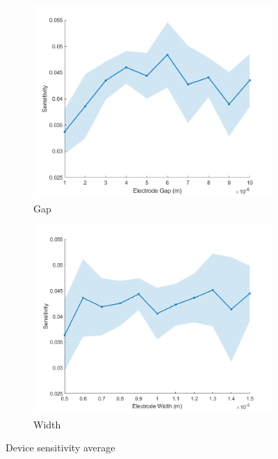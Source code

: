 \begin{figure}[h]
    \centering
    \begin{subfigure}[b]{0.49\textwidth}
        \centering
        \includegraphics[width=\textwidth]{images/comsol_device_gapXsensitivity_aveError.png}
        \caption{Gap}
    \end{subfigure}
    \hfill
    \begin{subfigure}[b]{0.49\textwidth}
        \centering
        \includegraphics[width=\textwidth]{images/comsol_device_widthXsensitivity_aveError.png}
        \caption{Width}
    \end{subfigure}
    \caption[Device sensitivity average]{Device sensitivity average}
    \label{fig:device_sensitivity_average}
\end{figure}

